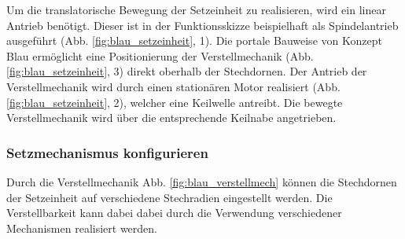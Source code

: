 Um die translatorische Bewegung der Setzeinheit zu realisieren, wird ein linear Antrieb benötigt. Dieser ist in der Funktionsskizze beispielhaft als Spindelantrieb ausgeführt (Abb. \ref{fig:blau_setzeinheit}, 1). Die portale Bauweise von Konzept Blau ermöglicht eine Positionierung der Verstellmechanik (Abb. \ref{fig:blau_setzeinheit}, 3) direkt oberhalb der Stechdornen. Der Antrieb der Verstellmechanik wird durch einen stationären Motor realisiert (Abb. \ref{fig:blau_setzeinheit}, 2), welcher eine Keilwelle antreibt. Die bewegte Verstellmechanik wird über die entsprechende Keilnabe angetrieben.

\subsubsection{Setzmechanismus konfigurieren}
Durch die Verstellmechanik Abb. \ref{fig:blau_verstellmech} können die Stechdornen der Setzeinheit auf verschiedene Stechradien eingestellt werden. Die Verstellbarkeit kann dabei dabei durch die Verwendung verschiedener Mechanismen realisiert werden. 
